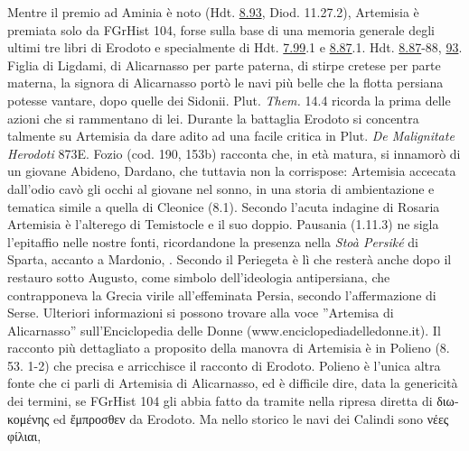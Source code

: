 {Mentre il premio ad Aminia è noto (Hdt. \href{http://data.perseus.org/citations/urn:cts:greekLit:tlg0016.tlg001.perseus-grc1:8.93}{8.93}, Diod. 11.27.2), Artemisia è premiata solo da FGrHist 104, forse sulla base di una memoria generale degli ultimi tre libri di Erodoto e specialmente di Hdt. \href{http://data.perseus.org/citations/urn:cts:greekLit:tlg0016.tlg001.perseus-grc1:7.99}{7.99}.1 e \href{http://data.perseus.org/citations/urn:cts:greekLit:tlg0016.tlg001.perseus-grc1:8.87}{8.87}.1. Hdt. \href{http://data.perseus.org/citations/urn:cts:greekLit:tlg0016.tlg001.perseus-grc1:8.87}{8.87}-88, \href{http://data.perseus.org/citations/urn:cts:greekLit:tlg0016.tlg001.perseus-grc1:8.93}{93}. Figlia di Ligdami, di Alicarnasso per parte paterna, di stirpe cretese per parte materna, la signora di Alicarnasso portò le navi più belle che la flotta persiana potesse vantare, dopo quelle dei Sidonii. Plut. \emph{Them.} 14.4 ricorda la prima delle azioni che si rammentano di lei. Durante la battaglia Erodoto si concentra talmente su Artemisia da  dare adito ad una facile critica in Plut. \emph{De Malignitate Herodoti} 873E. Fozio (cod. 190, 153b) racconta che, in età matura, si innamorò di un giovane Abideno, Dardano, che tuttavia non la corrispose: Artemisia accecata dall'odio cavò gli occhi al giovane nel sonno, in una storia di ambientazione e tematica simile a quella di Cleonice (8.1). Secondo l'acuta indagine di Rosaria \cite{MunsonVignolo1988} Artemisia è l'alterego di Temistocle e il suo doppio. Pausania (1.11.3) ne sigla l'epitaffio nelle nostre fonti, ricordandone la presenza nella \emph{Stoà Persiké} di Sparta, accanto a Mardonio, \cite[289]{Asheri2003}. Secondo il Periegeta è lì che resterà anche dopo il restauro sotto Augusto, come simbolo dell'ideologia antipersiana, che contrapponeva la Grecia virile all'effeminata Persia, secondo l'affermazione di Serse. Ulteriori informazioni si possono trovare alla voce ''Artemisa di Alicarnasso'' sull'Enciclopedia delle Donne (www.enciclopediadelledonne.it). Il racconto più dettagliato a proposito della manovra di Artemisia è in Polieno (8. 53. 1-2) che precisa e arricchisce il racconto di Erodoto. Polieno è l'unica altra fonte che ci parli di Artemisia di Alicarnasso, ed è difficile dire, data la genericità dei termini, se FGrHist 104 gli abbia fatto da tramite nella ripresa diretta di \textgreek{διωκομένης} ed \textgreek{ἔμπροσθεν} da Erodoto. Ma nello storico le navi dei Calindi sono \textgreek{νέες φίλιαι}, }
